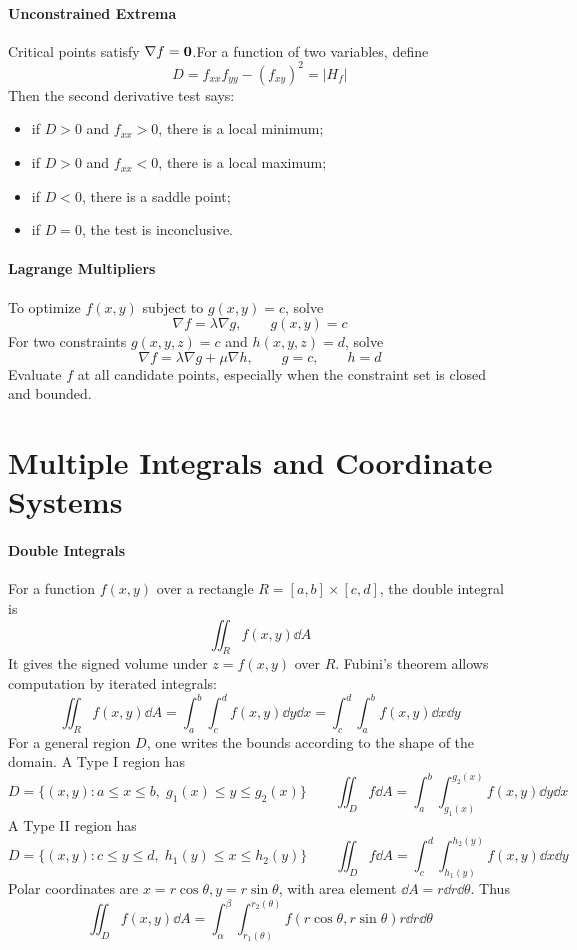 \documentclass[oneside]{book}
\begin{document}
\paragraph{Unconstrained Extrema}
Critical points satisfy $\nabla f=\mathbf{0}$.For a function of two variables, define
\[
    D=f_{xx}f_{yy}-(f_{xy})^2= |H_f|
\]
Then the second derivative test says:
\begin{itemize}
    \item if $D>0$ and $f_{xx}>0$, there is a local minimum;
    \item if $D>0$ and $f_{xx}<0$, there is a local maximum;
    \item if $D<0$, there is a saddle point;
    \item if $D=0$, the test is inconclusive.
\end{itemize}

\paragraph{Lagrange Multipliers}

To optimize $f(x,y)$ subject to $g(x,y)=c$, solve
\[
    \nabla f=\lambda\nabla g,
    \qquad g(x,y)=c
\]
For two constraints $g(x,y,z)=c$ and $h(x,y,z)=d$, solve
\[
    \nabla f=\lambda\nabla g+\mu\nabla h,
    \qquad g=c,
    \qquad h=d
\]
Evaluate $f$ at all candidate points, especially when the constraint set is closed and bounded.

\section{Multiple Integrals and Coordinate Systems}

\paragraph{Double Integrals}

For a function $f(x,y)$ over a rectangle $R=[a,b]\times[c,d]$, the double integral is
\[
    \iint_R f(x,y)\dd A
\]
It gives the signed volume under $z=f(x,y)$ over $R$. Fubini's theorem allows computation by iterated integrals:
\[
    \iint_R f(x,y)\dd A
    =\int_a^b\int_c^d f(x,y)\dd y\dd x
    =\int_c^d\int_a^b f(x,y)\dd x\dd y
\]
For a general region $D$, one writes the bounds according to the shape of the domain. A Type I region has
\[
    D=\{(x,y): a\leq x\leq b,\; g_1(x)\leq y\leq g_2(x)\}
\qquad
    \iint_D f\dd A=\int_a^b\int_{g_1(x)}^{g_2(x)}f(x,y)\dd y\dd x
\]
A Type II region has
\[
    D=\{(x,y): c\leq y\leq d,\; h_1(y)\leq x\leq h_2(y)\}
\qquad
    \iint_D f\dd A=\int_c^d\int_{h_1(y)}^{h_2(y)}f(x,y)\dd x\dd y
\]
Polar coordinates are $x=r\cos\theta, y=r\sin\theta$, with area element $\dd A=r\dd r\dd\theta$. Thus
\[
    \iint_D f(x,y)\dd A
    =\int_{\alpha}^{\beta}\int_{r_1(\theta)}^{r_2(\theta)}
    f(r\cos\theta,r\sin\theta)r\dd r\dd\theta
\]
\end{document}

